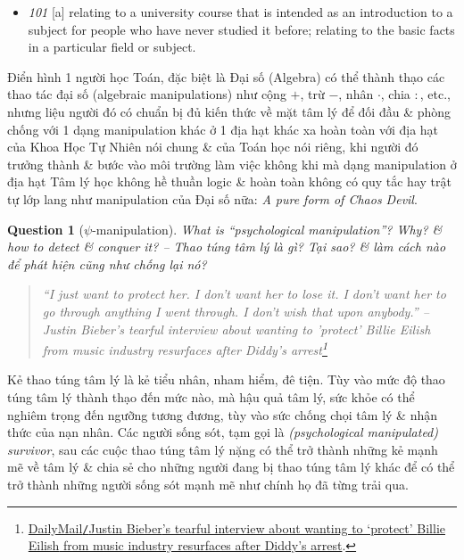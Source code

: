 \documentclass[12pt]{article}
\newtheorem{question}{Question}
\begin{document}
\begin{itemize}\small\sf
	\item {\it101} [a] relating to a university course that is intended as an introduction to a subject for people who have never studied it before; relating to the basic facts in a particular field or subject.
\end{itemize}
Điển hình 1 người học Toán, đặc biệt là Đại số (Algebra) có thể thành thạo các thao tác đại số (algebraic manipulations) như cộng $+$, trừ $-$, nhân $\cdot$, chia $:$, etc., nhưng liệu người đó có chuẩn bị đủ kiến thức về mặt tâm lý để đối đầu \& phòng chống với 1 dạng manipulation khác ở 1 địa hạt khác xa hoàn toàn với địa hạt của Khoa Học Tự Nhiên nói chung \& của Toán học nói riêng, khi người đó trưởng thành \& bước vào môi trường làm việc không khi mà dạng manipulation ở địa hạt Tâm lý học không hề thuần logic \& hoàn toàn không có quy tắc hay trật tự lớp lang như manipulation của Đại số nữa: {\it A pure form of Chaos Devil}.

\begin{question}[$\psi$-manipulation]
	What is ``psychological manipulation''? Why? \& how to detect \& conquer it? -- Thao túng tâm lý là gì? Tại sao? \& làm cách nào để phát hiện cũng như chống lại nó?
\end{question}

\begin{quotation}\it
	``I just want to protect her. I don't want her to lose it. I don't want her to go through anything I went through. I don't wish that upon anybody.'' -- {\sc Justin Bieber}'s tearful interview about wanting to 'protect' {\sc Billie Eilish} from music industry resurfaces after Diddy's arrest\footnote{\href{https://www.dailymail.co.uk/news/article-13885907/justin-bieber-tearful-interview-resurface-billie-eilish-diddy-arrest.html}{DailyMail{\tt/}{\sc Justin Bieber}'s tearful interview about wanting to `protect' {\sc Billie Eilish} from music industry resurfaces after Diddy's arrest}.}
\end{quotation}
Kẻ thao túng tâm lý là kẻ tiểu nhân, nham hiểm, đê tiện. Tùy vào mức độ thao túng tâm lý thành thạo đến mức nào, mà hậu quả tâm lý, sức khỏe có thể nghiêm trọng đến ngưỡng tương đương, tùy vào sức chống chọi tâm lý \& nhận thức của nạn nhân. Các người sống sót, tạm gọi là {\it (psychological manipulated) survivor}, sau các cuộc thao túng tâm lý nặng có thể trở thành những kẻ mạnh mẽ về tâm lý \& chia sẻ cho những người đang bị thao túng tâm lý khác để có thể trở thành những người sống sót mạnh mẽ như chính họ đã từng trải qua.
\end{document}
